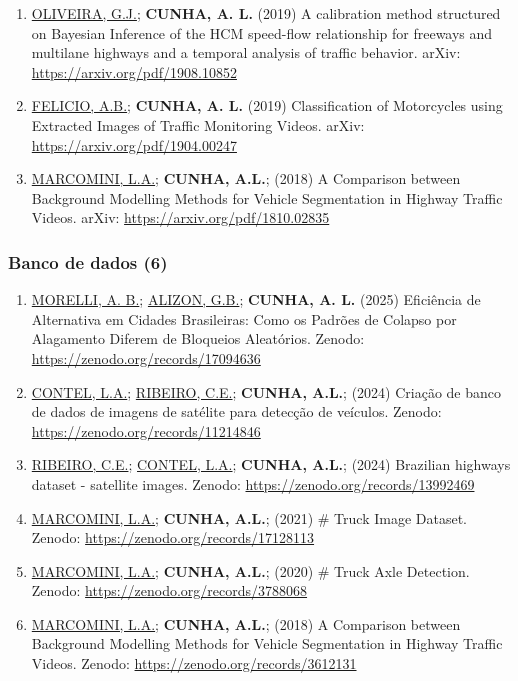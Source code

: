 \documentclass[
  brazilian,
  11pt,
  a4paper,
]{article}
\begin{document}
\begin{enumerate}
  \href{https://doi.org/10.1016/j.trd.2021.102770}{10.1016/j.trd.2021.102770}
\item
  \ul{OLIVEIRA, G.J.}; \textbf{CUNHA, A. L.} (2019) A calibration method
  structured on Bayesian Inference of the HCM speed-flow relationship
  for freeways and multilane highways and a temporal analysis of traffic
  behavior. arXiv: \url{https://arxiv.org/pdf/1908.10852}
\item
  \ul{FELICIO, A.B.}; \textbf{CUNHA, A. L.} (2019) Classification of
  Motorcycles using Extracted Images of Traffic Monitoring Videos.
  arXiv: \url{https://arxiv.org/pdf/1904.00247}
\item
  \ul{MARCOMINI, L.A.}; \textbf{CUNHA, A.L.}; (2018) A Comparison
  between Background Modelling Methods for Vehicle Segmentation in
  Highway Traffic Videos. arXiv: \url{https://arxiv.org/pdf/1810.02835}
\end{enumerate}

\subsubsection{Banco de dados (6)}\label{banco-de-dados-6}

\begin{enumerate}
\def\labelenumi{\arabic{enumi}.}
\item
  \ul{MORELLI, A. B.}; \ul{ALIZON, G.B.}; \textbf{CUNHA, A. L.} (2025)
  Eficiência de Alternativa em Cidades Brasileiras: Como os Padrões de
  Colapso por Alagamento Diferem de Bloqueios Aleatórios. Zenodo:
  \url{https://zenodo.org/records/17094636}
\item
  \ul{CONTEL, L.A.}; \ul{RIBEIRO, C.E.}; \textbf{CUNHA, A.L.}; (2024)
  Criação de banco de dados de imagens de satélite para detecção de
  veículos. Zenodo: \url{https://zenodo.org/records/11214846}
\item
  \ul{RIBEIRO, C.E.}; \ul{CONTEL, L.A.}; \textbf{CUNHA, A.L.}; (2024)
  Brazilian highways dataset - satellite images. Zenodo:
  \url{https://zenodo.org/records/13992469}
\item
  \ul{MARCOMINI, L.A.}; \textbf{CUNHA, A.L.}; (2021) \# Truck Image
  Dataset. Zenodo: \url{https://zenodo.org/records/17128113}
\item
  \ul{MARCOMINI, L.A.}; \textbf{CUNHA, A.L.}; (2020) \# Truck Axle
  Detection. Zenodo: \url{https://zenodo.org/records/3788068}
\item
  \ul{MARCOMINI, L.A.}; \textbf{CUNHA, A.L.}; (2018) A Comparison
  between Background Modelling Methods for Vehicle Segmentation in
  Highway Traffic Videos. Zenodo:
  \url{https://zenodo.org/records/3612131}
\end{enumerate}
\end{document}

